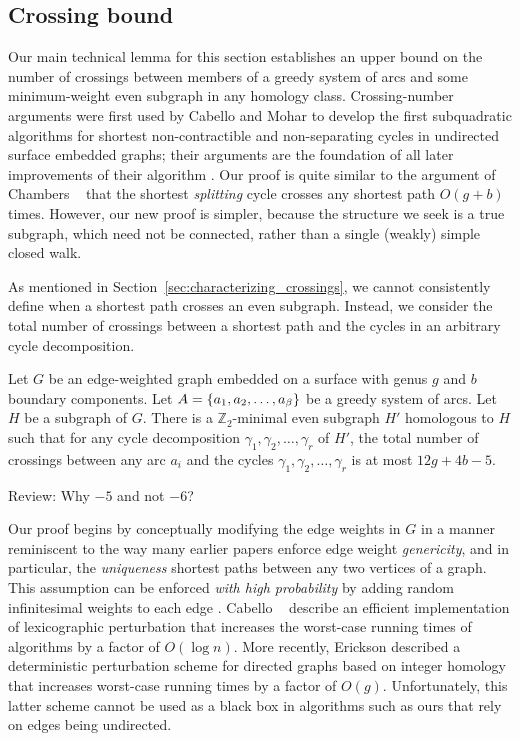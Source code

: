 \documentclass[letterpaper,review]{siamart190516}
\def\Z{\mathbb{Z}}
\def\rnote#1{\color{red}Review: #1 \color{black}}
\begin{document}
\subsection{Crossing bound}
\label{SS:homotopy-crossing}

Our main technical lemma for this section establishes an upper bound on the number of crossings
between members of a greedy system of arcs and some minimum-weight even subgraph in any homology class.  Crossing-number arguments were first used by Cabello and Mohar \cite{cm-fsnsn-07} to develop the first subquadratic algorithms for shortest non-contractible and non-separating cycles in undirected surface embedded graphs; their arguments are the foundation of all later improvements of their algorithm \cite{c-mdpg-06, k-csnco-06, cce-msspe-13}.  Our proof is quite similar to the argument of Chambers \etal~\cite{ccelw-scsih-08} that the shortest \emph{splitting} cycle crosses any shortest path $O(g+b)$ times.  However, our new proof is simpler, because the structure we seek is a true subgraph, which need not be connected, rather than a single (weakly) simple closed walk.

As mentioned in Section~\ref{sec:characterizing_crossings}, we cannot consistently define when a shortest path crosses an even subgraph.  Instead, we consider the total number of crossings between a shortest path and the cycles in an arbitrary cycle decomposition.

\begin{lemma}
\label{lem:crossing}
Let $G$ be an edge-weighted graph embedded on a surface with genus $g$ and $b$ boundary components.
Let $A = \left\{ a_1, a_2, \dots, a_\beta \right\}$ be a greedy system of arcs.
Let $H$ be a subgraph of $G$.
There is a $\Z_2$-minimal even subgraph $H'$ homologous to $H$ such that for any cycle decomposition
$\gamma_1, \gamma_2, \dots, \gamma_r$ of $H'$, the total number of crossings between any arc $a_i$
and the cycles $\gamma_1, \gamma_2, \dots, \gamma_r$ is at most $12g+4b-5$.

\rnote{
Why $-5$ and not $-6$? 
}
\end{lemma}

Our proof begins by conceptually modifying the edge weights in $G$ in a manner reminiscent to the
way many earlier papers \cite{cce-msspe-13, benw-amcnt-16, mnnw-mdpgo-18, bsw-msopg-15, e-pspmf-10,
eh-ocsd-04} enforce edge weight \emph{genericity}, and in particular, the \emph{uniqueness} shortest
paths between any two vertices of a graph.
This assumption can be enforced \emph{with high probability} by adding random infinitesimal weights
to each edge \cite{mvv-memi-87}.
Cabello \etal~\cite{cce-msspe-13} describe an efficient
implementation of lexicographic perturbation \cite{c-odlp-52,dow-gsmml-55,hm-apmcb-94} that
increases the worst-case running times of algorithms by a factor of $O(\log n)$.
More recently, Erickson \etal \cite{efl-hmcpf-18} described a deterministic perturbation scheme for
directed graphs based on integer homology that increases worst-case running times by a factor of
$O(g)$.
Unfortunately, this latter scheme cannot be used as a black box in algorithms such as ours that rely
on edges being undirected.
\end{document}
